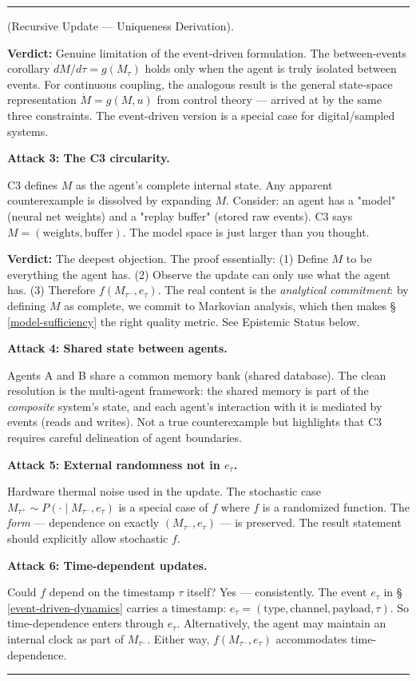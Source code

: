 \documentclass[11pt,oneside]{article}
\newcounter{claim}[section]
\renewcommand{\theclaim}{\thesection.\arabic{claim}}
\newenvironment{segment}[2]{%
  \refstepcounter{claim}%
  \bigskip\noindent\hrule\smallskip
  \noindent{\bfseries #1~\theclaim}\enskip(#2).\par\smallskip
  \noindent\ignorespaces
}{%
  \par\smallskip\noindent\hrule\bigskip
}
\newenvironment{derivation}[1][]{\begin{segment}{Derivation}{#1}}{\end{segment}}
\begin{document}
\begin{derivation}[Recursive Update — Uniqueness Derivation]
\textbf{Verdict:} Genuine limitation of the event-driven formulation. The between-events corollary $dM/d\tau = g(M_\tau)$ holds only when the agent is truly isolated between events. For continuous coupling, the analogous result is the general state-space representation $\dot{M} = g(M, u)$ from control theory — arrived at by the same three constraints. The event-driven version is a special case for digital/sampled systems.


\medskip\noindent\textbf{Attack 3: The C3 circularity.}


C3 defines $M$ as the agent's complete internal state. Any apparent counterexample is dissolved by expanding $M$. Consider: an agent has a "model" (neural net weights) and a "replay buffer" (stored raw events). C3 says $M = (\text{weights}, \text{buffer})$. The model space is just larger than you thought.

\textbf{Verdict:} The deepest objection. The proof essentially: (1) Define $M$ to be everything the agent has. (2) Observe the update can only use what the agent has. (3) Therefore $f(M_{\tau^-}, e_\tau)$. The real content is the \textit{analytical commitment}: by defining $M$ as complete, we commit to Markovian analysis, which then makes \S\,\ref{model-sufficiency} the right quality metric. See Epistemic Status below.


\medskip\noindent\textbf{Attack 4: Shared state between agents.}


Agents A and B share a common memory bank (shared database). The clean resolution is the multi-agent framework: the shared memory is part of the \textit{composite} system's state, and each agent's interaction with it is mediated by events (reads and writes). Not a true counterexample but highlights that C3 requires careful delineation of agent boundaries.


\medskip\noindent\textbf{Attack 5: External randomness not in $e_\tau$.}


Hardware thermal noise used in the update. The stochastic case $M_{\tau^+} \sim P(\cdot \mid M_{\tau^-}, e_\tau)$ is a special case of $f$ where $f$ is a randomized function. The \textit{form} — dependence on exactly $(M_{\tau^-}, e_\tau)$ — is preserved. The result statement should explicitly allow stochastic $f$.


\medskip\noindent\textbf{Attack 6: Time-dependent updates.}


Could $f$ depend on the timestamp $\tau$ itself? Yes — consistently. The event $e_\tau$ in \S\,\ref{event-driven-dynamics} carries a timestamp: $e_\tau = (\text{type}, \text{channel}, \text{payload}, \tau)$. So time-dependence enters through $e_\tau$. Alternatively, the agent may maintain an internal clock as part of $M_{\tau^-}$. Either way, $f(M_{\tau^-}, e_\tau)$ accommodates time-dependence.



\end{derivation}
\end{document}
